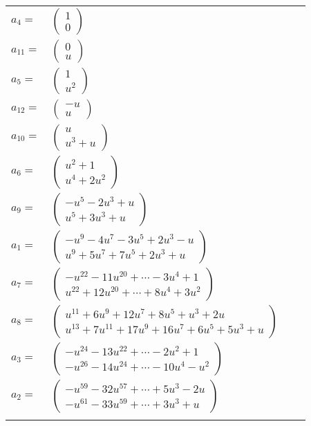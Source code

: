 \documentclass[1p]{elsarticle_modified}
\theoremstyle{definition}
\begin{document}
\begin{tabular}{m{7pt} m{180pt} m{7pt} m{180pt} }
\flushright $a_{4}=$&$\begin{pmatrix}1\\0\end{pmatrix}$ \\
\flushright $a_{11}=$&$\begin{pmatrix}0\\u\end{pmatrix}$ \\
\flushright $a_{5}=$&$\begin{pmatrix}1\\u^2\end{pmatrix}$ \\
\flushright $a_{12}=$&$\begin{pmatrix}- u\\u\end{pmatrix}$ \\
\flushright $a_{10}=$&$\begin{pmatrix}u\\u^3+u\end{pmatrix}$ \\
\flushright $a_{6}=$&$\begin{pmatrix}u^2+1\\u^4+2 u^2\end{pmatrix}$ \\
\flushright $a_{9}=$&$\begin{pmatrix}- u^5-2 u^3+u\\u^5+3 u^3+u\end{pmatrix}$ \\
\flushright $a_{1}=$&$\begin{pmatrix}- u^9-4 u^7-3 u^5+2 u^3- u\\u^9+5 u^7+7 u^5+2 u^3+u\end{pmatrix}$ \\
\flushright $a_{7}=$&$\begin{pmatrix}- u^{22}-11 u^{20}+\cdots-3 u^4+1\\u^{22}+12 u^{20}+\cdots+8 u^4+3 u^2\end{pmatrix}$ \\
\flushright $a_{8}=$&$\begin{pmatrix}u^{11}+6 u^9+12 u^7+8 u^5+u^3+2 u\\u^{13}+7 u^{11}+17 u^9+16 u^7+6 u^5+5 u^3+u\end{pmatrix}$ \\
\flushright $a_{3}=$&$\begin{pmatrix}- u^{24}-13 u^{22}+\cdots-2 u^2+1\\- u^{26}-14 u^{24}+\cdots-10 u^4- u^2\end{pmatrix}$ \\
\flushright $a_{2}=$&$\begin{pmatrix}- u^{59}-32 u^{57}+\cdots+5 u^3-2 u\\- u^{61}-33 u^{59}+\cdots+3 u^3+u\end{pmatrix}$\\&\end{tabular}
\end{document}
